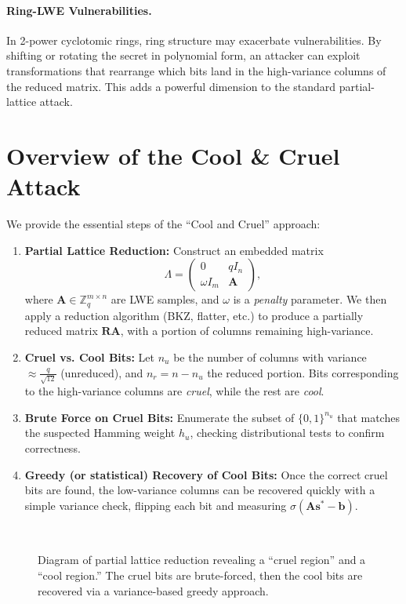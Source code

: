 \documentclass[11pt]{article}
\begin{document}
\paragraph{Ring-LWE Vulnerabilities.}
In 2-power cyclotomic rings, ring structure may exacerbate vulnerabilities. By shifting or rotating the secret in polynomial form, an attacker can exploit transformations that rearrange which bits land in the high-variance columns of the reduced matrix. This adds a powerful dimension to the standard partial-lattice attack.

\section{Overview of the Cool \& Cruel Attack}
\label{sec:attack_overview}
We provide the essential steps of the ``Cool and Cruel'' approach:

\begin{enumerate}
  \item \textbf{Partial Lattice Reduction:}
    Construct an embedded matrix
    \[
      \Lambda =
      \begin{pmatrix}
        0 & q I_n \\
        \omega I_m & \mathbf{A}
      \end{pmatrix},
    \]
    where $\mathbf{A} \in \mathbb{Z}_q^{m \times n}$ are LWE samples, and $\omega$ is a \emph{penalty} parameter. We then apply a reduction algorithm (BKZ, flatter, etc.) to produce a partially reduced matrix $\mathbf{R}\mathbf{A}$, with a portion of columns remaining high-variance.
  \item \textbf{Cruel vs. Cool Bits:}
    Let $n_u$ be the number of columns with variance $\approx \frac{q}{\sqrt{12}}$ (unreduced), and $n_r = n - n_u$ the reduced portion. Bits corresponding to the high-variance columns are \emph{cruel}, while the rest are \emph{cool}.
  \item \textbf{Brute Force on Cruel Bits:}
    Enumerate the subset of $\{0,1\}^{n_u}$ that matches the suspected Hamming weight $h_u$, checking distributional tests to confirm correctness.
  \item \textbf{Greedy (or statistical) Recovery of Cool Bits:}
    Once the correct cruel bits are found, the low-variance columns can be recovered quickly with a simple variance check, flipping each bit and measuring $\sigma(\mathbf{A}\mathbf{s}^* - \mathbf{b})$.
\end{enumerate}

\begin{figure}[ht]
  \centering
  \
  \caption{Diagram of partial lattice reduction revealing a ``cruel region'' and a ``cool region.'' The cruel bits are brute-forced, then the cool bits are recovered via a variance-based greedy approach.}
  \label{fig:attack_overview}
\end{figure}
\end{document}

